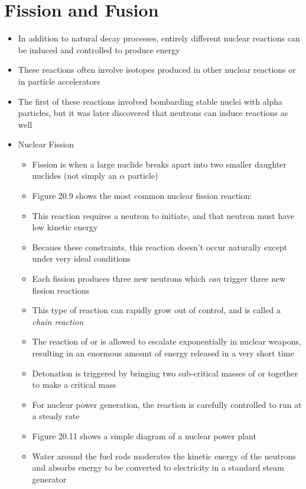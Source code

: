 \documentclass[12pt, openany, letterpaper]{memoir}
\begin{document}
\section{Fission and Fusion}
\begin{itemize}
	\item In addition to natural decay processes, entirely different nuclear reactions can be induced and controlled to produce energy
	\item These reactions often involve isotopes produced in other nuclear reactions or in particle accelerators
	\item The first of these reactions involved bombarding stable nuclei with alpha particles, but it was later discovered that neutrons can induce reactions as well
	\item Nuclear Fission
	\begin{itemize}
		\item Fission is when a large nuclide breaks apart into two smaller daughter nuclides (not simply an $\alpha$ particle)
		\item Figure 20.9 shows the most common nuclear fission reaction: \\
		\item This reaction requires a neutron to initiate, and that neutron must have low kinetic energy
		\item Becaues these constraints, this reaction doesn't occur naturally except under very ideal conditions
		\item Each fission produces three new neutrons which \emph{can} trigger three new fission reactions
		\item This type of reaction can rapidly grow out of control, and is called a \emph{chain reaction}
		\item The reaction of  or  is allowed to escalate exponentially in nuclear weapons, resulting in an enormous amount of energy released in a very short time
		\item Detonation is triggered by bringing two sub-critical masses of  or  together to make a critical mass
		\item For nuclear power generation, the reaction is carefully controlled to run at a steady rate
		\item Figure 20.11 shows a simple diagram of a nuclear power plant
		\item Water around the fuel rods moderates the kinetic energy of the neutrons and absorbs energy to be converted to electricity in a standard steam generator

\end{itemize}
\end{itemize}
\end{document}
